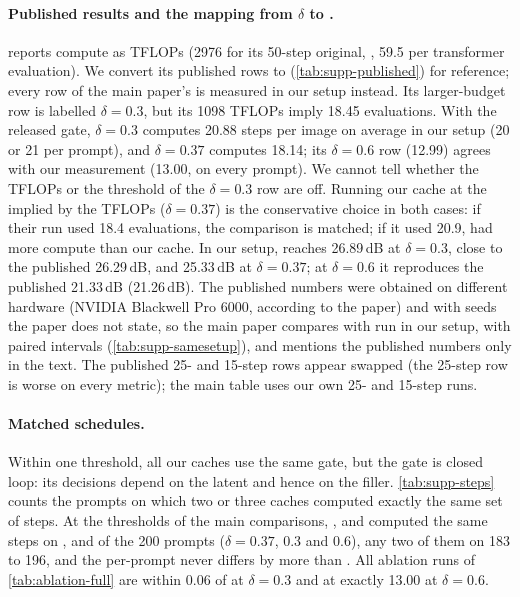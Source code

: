 

\paragraph{Published results and the mapping from $\delta$ to \nfe.}
\seacache reports compute as TFLOPs (2976 for its 50-step original, \ie, 59.5 per transformer evaluation). We convert
its published rows to \nfe (\cref{tab:supp-published}) for reference; every row of the main paper's
 is measured in our setup instead. Its larger-budget row is labelled $\delta=0.3$, but its 1098 TFLOPs imply 18.45 evaluations.
With the released gate, $\delta=0.3$ computes 20.88 steps per image on average in our setup (20 or 21 per prompt), and
$\delta=0.37$ computes 18.14; its $\delta=0.6$ row (12.99) agrees with our measurement (13.00, on every prompt). We
cannot tell whether the TFLOPs or the threshold of the $\delta=0.3$ row are off. Running our cache at the \nfe implied by
the TFLOPs ($\delta=0.37$) is the conservative choice in both cases: if their run used 18.4 evaluations, the comparison is
matched; if it used 20.9, \seacache had more compute than our cache. In our setup, \seacache reaches 26.89\,dB at
$\delta=0.3$, close to the published 26.29\,dB, and 25.33\,dB at $\delta=0.37$; at $\delta=0.6$ it reproduces the
published 21.33\,dB (21.26\,dB). The published numbers were obtained on different hardware (NVIDIA Blackwell Pro 6000,
according to the paper) and with seeds the paper does not state, so the main paper compares with \seacache run in our setup, with
paired intervals (\cref{tab:supp-samesetup}), and mentions the published numbers only in the text. The published 25- and
15-step rows appear swapped (the 25-step row is worse on every metric); the main table uses our own 25- and 15-step
runs.

\paragraph{Matched schedules.}
Within one threshold, all our caches use the same \sea gate, but the gate is closed loop: its decisions depend on the
latent and hence on the filler. \cref{tab:supp-steps} counts the prompts on which two or three caches computed exactly
the same set of steps. At the thresholds of the main comparisons, \seacache, \kalsea and \ours computed the same steps on
\suppSameThreeA, \suppSameThreeC{} and \suppSameThreeB{} of the 200 prompts ($\delta=0.37$, $0.3$ and $0.6$), any two of
them on 183 to 196, and the per-prompt \nfe never differs by more than \suppSameThreeMaxDnfe. All ablation runs of
\cref{tab:ablation-full} are within 0.06 \nfe of \ours at $\delta=0.3$ and at exactly 13.00 \nfe at $\delta=0.6$.

